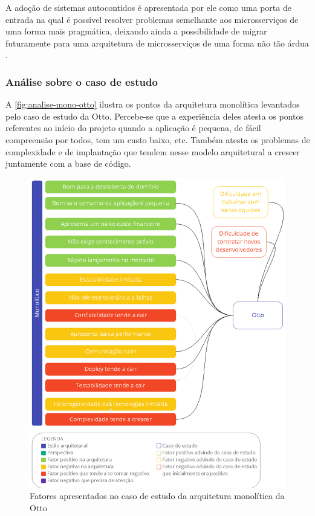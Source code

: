 A adoção de sistemas autocontidos é apresentada por ele como uma porta de entrada na qual é possível
resolver problemas semelhante aos microsserviços de uma forma mais pragmática, deixando ainda a
possibilidade de migrar futuramente para uma arquitetura de microsserviços de uma forma não tão
árdua \cite{Guido2016:WhyMicroservices}.
    
\subsubsection{Análise sobre o caso de estudo}

A \autoref{fig:analise-mono-otto} ilustra os pontos da arquitetura monolítica levantados pelo
caso de estudo da Otto. Percebe-se que a experiência deles atesta os pontos referentes ao início do
projeto quando a aplicação é pequena, de fácil compreensão por todos, tem um custo baixo, etc.
Também atesta os problemas de complexidade e de implantação que tendem nesse modelo arquitetural a
crescer juntamente com a base de código.


\begin{figure}[h]
  \centering
  \includegraphics[keepaspectratio=true,scale=1]{figuras/monoOtto.eps}
  \caption{Fatores apresentados no caso de estudo da arquitetura monolítica da Otto\label{fig:analise-mono-otto}}
\end{figure}

